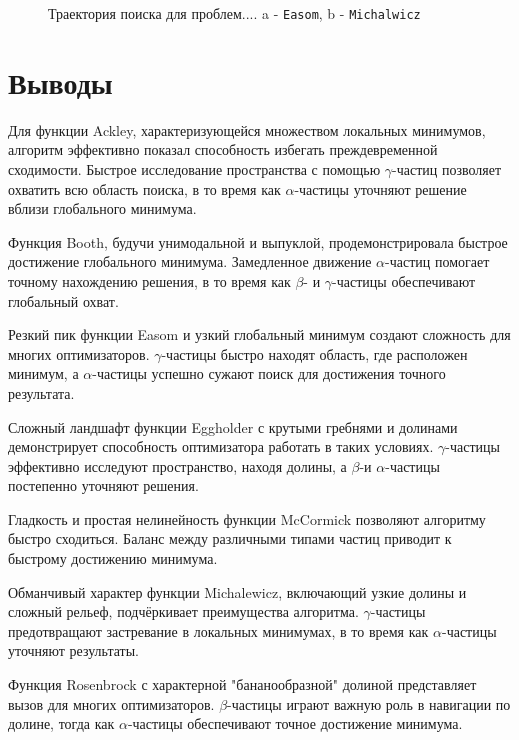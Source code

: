 \documentclass[10pt]{article}
\begin{document}
\begin{figure}[H]
    \centering
    \caption{Траектория поиска для проблем.... a - \texttt{Easom}, b - 
   \texttt{Michalwicz}}
    \label{fig:ridgesdrops}
\end{figure}
\section{Выводы}

Для функции Ackley, характеризующейся множеством локальных минимумов, алгоритм эффективно показал способность избегать преждевременной сходимости. Быстрое исследование пространства с помощью $\gamma$-частиц позволяет охватить всю область поиска, в то время как $\alpha$-частицы уточняют решение вблизи глобального минимума.

Функция Booth, будучи унимодальной и выпуклой, продемонстрировала быстрое достижение глобального минимума. Замедленное движение $\alpha$-частиц помогает точному нахождению решения, в то время как $\beta$- и $\gamma$-частицы обеспечивают глобальный охват.

Резкий пик функции Easom и узкий глобальный минимум создают сложность для многих оптимизаторов. $\gamma$-частицы быстро находят область, где расположен минимум, а $\alpha$-частицы успешно сужают поиск для достижения точного результата.

Сложный ландшафт функции Eggholder с крутыми гребнями и долинами демонстрирует способность оптимизатора работать в таких условиях. $\gamma$-частицы эффективно исследуют пространство, находя долины, а $\beta$-и $\alpha$-частицы постепенно уточняют решения.

Гладкость и простая нелинейность функции McCormick позволяют алгоритму быстро сходиться. Баланс между различными типами частиц приводит к быстрому достижению минимума.

Обманчивый характер функции Michalewicz, включающий узкие долины и сложный рельеф, подчёркивает преимущества алгоритма. $\gamma$-частицы предотвращают застревание в локальных минимумах, в то время как $\alpha$-частицы уточняют результаты.

Функция Rosenbrock с характерной "бананообразной" долиной представляет вызов для многих оптимизаторов. $\beta$-частицы играют важную роль в навигации по долине, тогда как $\alpha$-частицы обеспечивают точное достижение минимума.
\end{document}
